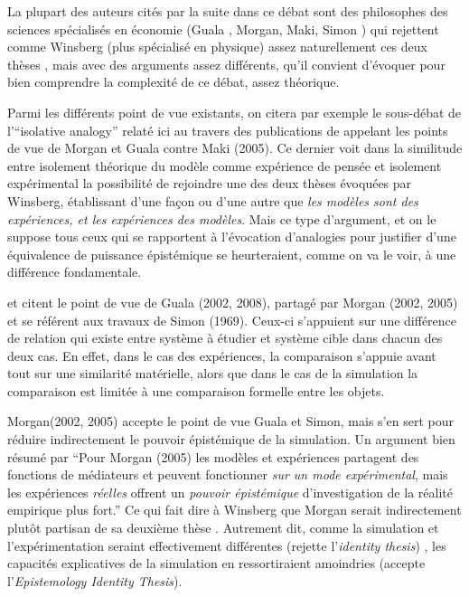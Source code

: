 La plupart des auteurs cités par la suite dans ce débat sont des philosophes des sciences spécialisés en économie (Guala , Morgan, Maki, Simon ) qui rejettent comme Winsberg (plus spécialisé en physique) assez naturellement ces deux thèses \autocite{Winsberg2009}, mais avec des arguments assez différents, qu'il convient d'évoquer pour bien comprendre la complexité de ce débat, assez théorique.

Parmi les différents point de vue existants, on citera par exemple le sous-débat de l'\foreignquote{english}{isolative analogy} relaté ici au travers des publications de \textcite{Phan2008, Phan2010} appelant les points de vue de Morgan et Guala contre Maki (2005). Ce dernier voit dans la similitude entre isolement théorique du modèle comme expérience de pensée et isolement expérimental  la possibilité de rejoindre une des deux thèses évoquées par Winsberg, établissant d'une façon ou d'une autre que \textit{les modèles sont des expériences, et les expériences des modèles}. Mais ce type d'argument, et on le suppose tous ceux qui se rapportent à l'évocation d'analogies pour justifier d'une équivalence de puissance épistémique se heurteraient, comme on va le voir, à une différence fondamentale.

\textcite{Phan2010} et \textcite{Winsberg2013} citent le point de vue de Guala (2002, 2008), partagé par Morgan (2002, 2005) et se référent aux travaux de Simon (1969). Ceux-ci s'appuient sur une différence de relation qui existe entre système à étudier et système cible dans chacun des deux cas. En effet, dans le cas des expériences, la comparaison s'appuie avant tout sur une similarité matérielle, alors que dans le cas de la simulation la comparaison est limitée à une comparaison formelle entre les objets.

Morgan(2002, 2005) accepte le point de vue Guala et Simon, mais s'en sert pour réduire indirectement le pouvoir épistémique de la simulation. Un argument bien résumé par \textcite{Phan2008} \enquote{Pour Morgan (2005) les modèles et expériences partagent des fonctions de médiateurs et peuvent fonctionner \textit{sur un mode expérimental}, mais les expériences \textit{réelles} offrent un \textit{pouvoir épistémique} d'investigation de la réalité empirique plus fort.}  Ce qui fait dire à Winsberg que Morgan serait indirectement plutôt partisan de sa deuxième thèse . Autrement dit, comme la simulation et l'expérimentation seraint effectivement différentes (rejette l'\textit{identity thesis}) , les capacités explicatives de la simulation en ressortiraient amoindries (accepte l'\textit{Epistemology Identity Thesis}).

